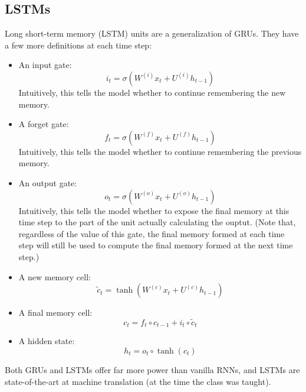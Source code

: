 \subsection{LSTMs}
Long short-term memory (LSTM) units are a generalization of GRUs. They have a few more definitions at each time step:
\begin{itemize}
\item An input gate:
$$i_t = \sigma\left(W^{(i)}x_t + U^{(i)}h_{t-1}\right)$$
Intuitively, this tells the model whether to continue remembering the new memory.
\item A forget gate:
$$f_t = \sigma\left(W^{(f)}x_t + U^{(f)}h_{t-1}\right)$$
Intuitively, this tells the model whether to continue remembering the previous memory.
\item An output gate:
$$o_t = \sigma\left(W^{(o)}x_t + U^{(o)}h_{t-1}\right)$$
Intuitively, this tells the model whether to expose the final memory at this time step to the part of the unit actually calculating the ouptut. (Note that, regardless of the value of this gate, the final memory formed at each time step will still be used to compute the final memory formed at the next time step.)
\item A new memory cell:
$$\tilde{c}_t = \tanh\left(W^{(c)}x_t + U^{(c)}h_{t-1}\right)$$
\item A final memory cell:
$$c_t = f_t \circ c_{t-1} + i_t \circ \tilde{c}_t$$
\item A hidden state:
$$h_t = o_t \circ \tanh(c_t)$$
\end{itemize}
Both GRUs and LSTMs offer far more power than vanilla RNNs, and LSTMs are state-of-the-art at machine translation (at the time the class was taught).
